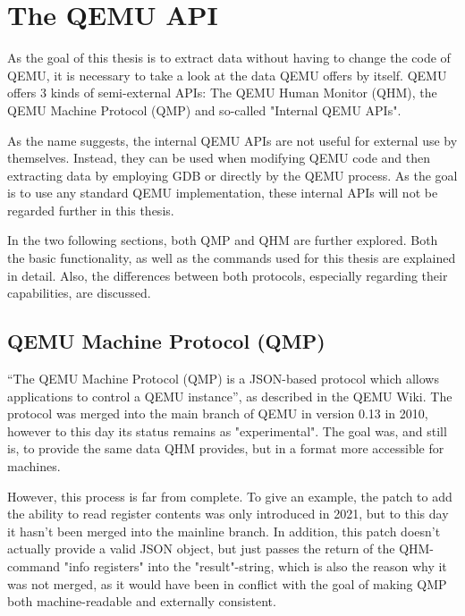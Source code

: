
\chapter{The QEMU API} \label{chap:QEMU_API}
As the goal of this thesis is to extract data without having to change the code of QEMU,
it is necessary to take a look at the data QEMU offers by itself.
QEMU offers 3 kinds of semi-external APIs: The QEMU Human Monitor (QHM)\cite{qhm-documentation},
the QEMU Machine Protocol (QMP)\cite{qmp-description} and so-called "Internal QEMU APIs"\cite{internal}.

As the name suggests, the internal QEMU APIs are not useful for external use by themselves.
Instead, they can be used when modifying QEMU code and then extracting data by employing GDB or directly by the QEMU process.
As the goal is to use any standard QEMU implementation, these internal APIs will not be regarded further in this thesis.

In the two following sections, both QMP and QHM are further explored. Both the basic functionality,
as well as the commands used for this thesis are explained in detail.
Also, the differences between both protocols, especially regarding their capabilities,
are discussed.

\section{QEMU Machine Protocol (QMP)} \label{sec:QMP}
\enquote{The QEMU Machine Protocol (QMP) is a JSON-based protocol which allows applications to control a QEMU instance}\cite{qmp-description}, as described in the QEMU Wiki.
The protocol was merged into the main branch of QEMU in version 0.13 in 2010, however to this day its status remains as "experimental"\cite{qmp-merge}.
The goal was, and still is, to provide the same data QHM provides, but in a format more accessible for machines.

However, this process is far from complete. To give an example, the patch to add the ability to read register contents was only introduced in 2021,
but to this day it hasn't been merged into the mainline branch.
In addition, this patch doesn't actually provide a valid JSON object, but just passes the return of the QHM-command "info registers" into the "result"-string\cite{qmp-registers-patch},
which is also the reason why it was not merged, as it would have been in conflict with the goal of making QMP both machine-readable and externally consistent.

